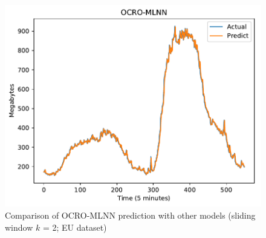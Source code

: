 \documentclass[smallcondensed, natbib]{svjour3}     %
\begin{document}
{\begin{figure}[!ht]
\begin{minipage}[b]{0.33\linewidth}
    \includegraphics[width=0.9\linewidth]{predict/k2/eu_k2_ocro_mlnn.pdf} 
  \end{minipage} 
  
  \caption{Comparison of OCRO-MLNN prediction with other models (sliding window $k$ = 2; EU dataset)} 
  \label{predict_eu_sliding2} 
\end{figure}

}
\end{document}
